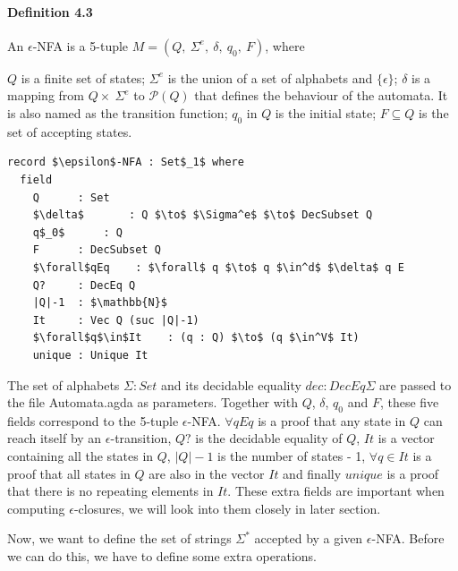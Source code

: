 \documentclass[twoside,openright,final]{bhamthesis}
\renewcommand{\item}{\itemindent0.5cm\itemold}
\begin{document}
\paragraph{Definition 4.3} An \(\epsilon\)-NFA is a 5-tuple \(M = (Q
,\ \Sigma^e,\ \delta,\ q_0,\ F)\), where
\begin{enumerate}[nolistsep]
  \item \(Q\) is a finite set of states;
  \item \(\Sigma^e\) is the union of a set of alphabets and \(\{\epsilon\}\);
  \item \(\delta\) is a mapping from \(Q \times\ \Sigma^e\) to
    \(\mathcal P \left({Q}\right)\) that defines the behaviour of the
    automata. It is also named as the transition function;
  \item \(q_0\) in \(Q\) is the initial state;
  \item \(F \subseteq Q\) is the set of accepting states. 
\end{enumerate}
\begin{lstlisting}[caption=\(\epsilon\)-NFA,mathescape=true]
record $\epsilon$-NFA : Set$_1$ where
  field
    Q      : Set
    $\delta$       : Q $\to$ $\Sigma^e$ $\to$ DecSubset Q
    q$_0$      : Q
    F      : DecSubset Q
    $\forall$qEq    : $\forall$ q $\to$ q $\in^d$ $\delta$ q E
    Q?     : DecEq Q
    |Q|-1  : $\mathbb{N}$
    It     : Vec Q (suc |Q|-1)
    $\forall$q$\in$It    : (q : Q) $\to$ (q $\in^V$ It)
    unique : Unique It
\end{lstlisting}
\vspace{1pc}
\par The set of alphabets \(\Sigma : Set\) and its decidable equality
\(dec : DecEq \Sigma\) are passed to the file
Automata.agda as parameters. Together with \(Q\), \(\delta\),
\(q_0\) and \(F\), these five fields correspond to the 5-tuple
\(\epsilon\)-NFA. \(\forall qEq\) is a proof that any state in \(Q\)
can reach itself by an \(\epsilon\)-transition, \(Q?\) is
the decidable equality of \(Q\), \(It\) is a vector containing all the
states in \(Q\), \(|Q|-1\) is the number of states - 1, \(\forall q\in It\) is a
proof that all states in \(Q\) are also in the vector \(It\) and
finally \(unique\) is a proof that there is no repeating elements in
\(It\). These extra fields are important when computing
\(\epsilon\)-closures, we will look into them closely in later
section. 

\par Now, we want to define the set of strings \(\Sigma^*\) accepted by a given
\(\epsilon\)-NFA. Before we can do this, we have to define some extra operations.
\end{document}
